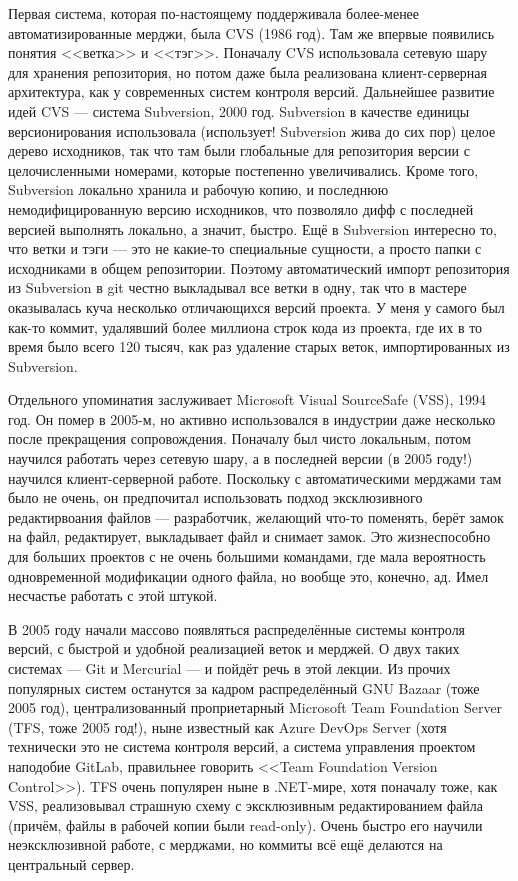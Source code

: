 \documentclass[a5paper]{article}
\begin{document}
Первая система, которая по-настоящему поддерживала более-менее автоматизированные мерджи, была CVS (1986 год). Там же впервые появились понятия <<ветка>> и <<тэг>>. Поначалу CVS использовала сетевую шару для хранения репозитория, но потом даже была реализована клиент-серверная архитектура, как у современных систем контроля версий. Дальнейшее развитие идей CVS --- система Subversion, 2000 год. Subversion в качестве единицы версионирования использовала (использует! Subversion жива до сих пор) целое дерево исходников, так что там были глобальные для репозитория версии с целочисленными номерами, которые постепенно увеличивались. Кроме того, Subversion локально хранила и рабочую копию, и последнюю немодифицированную версию исходников, что позволяло дифф с последней версией выполнять локально, а значит, быстро. Ещё в Subversion интересно то, что ветки и тэги --- это не какие-то специальные сущности, а просто папки с исходниками в общем репозитории. Поэтому автоматический импорт репозитория из Subversion в git честно выкладывал все ветки в одну, так что в мастере оказывалась куча несколько отличающихся версий проекта. У меня у самого был как-то коммит, удалявший более миллиона строк кода из проекта, где их в то время было всего 120 тысяч, как раз удаление старых веток, импортированных из Subversion.

Отдельного упоминатия заслуживает Microsoft Visual SourceSafe (VSS), 1994 год. Он помер в 2005-м, но активно использовался в индустрии даже несколько после прекращения сопровождения. Поначалу был чисто локальным, потом научился работать через сетевую шару, а в последней версии (в 2005 году!) научился клиент-серверной работе. Поскольку с автоматическими мерджами там было не очень, он предпочитал использовать подход эксклюзивного редактирвоания файлов --- разработчик, желающий что-то поменять, берёт замок на файл, редактирует, выкладывает файл и снимает замок. Это жизнеспособно для больших проектов с не очень большими командами, где мала вероятность одновременной модификации одного файла, но вообще это, конечно, ад. Имел несчастье работать с этой штукой.

В 2005 году начали массово появляться распределённые системы контроля версий, с быстрой и удобной реализацией веток и мерджей. О двух таких системах --- Git и Mercurial --- и пойдёт речь в этой лекции. Из прочих популярных систем останутся за кадром распределённый GNU Bazaar (тоже 2005 год), централизованный проприетарный Microsoft Team Foundation Server (TFS, тоже 2005 год!), ныне известный как Azure DevOps Server (хотя технически это не система контроля версий, а система управления проектом наподобие GitLab, правильнее говорить <<Team Foundation Version Control>>). TFS очень популярен ныне в .NET-мире, хотя поначалу тоже, как VSS, реализовывал страшную схему с эксклюзивным редактированием файла (причём, файлы в рабочей копии были read-only). Очень быстро его научили неэксклюзивной работе, с мерджами, но коммиты всё ещё делаются на центральный сервер.
\end{document}
